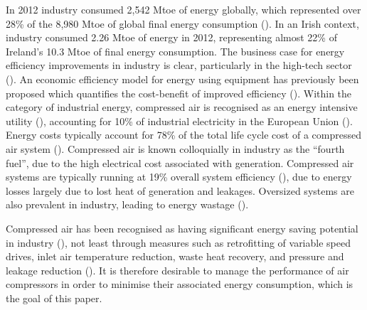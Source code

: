 In 2012 industry consumed 2,542 Mtoe of energy globally, which represented  over 28\% of the 8,980 Mtoe of global final energy consumption (\cite{IEA2012}). In an Irish context, industry consumed 2.26 Mtoe of energy in 2012, representing almost 22\% of Ireland’s 10.3 Mtoe of final energy consumption. The business case for energy efficiency improvements in industry is clear, particularly in the high-tech sector (\cite{Mills2007}). An economic efficiency model for energy using equipment has previously been proposed which quantifies the cost-benefit of improved efficiency (\cite{Blum2014}). Within the category of industrial energy, compressed air is recognised as an energy intensive utility (\cite{Wang2013a}), accounting for 10\% of industrial electricity in the European Union (\cite{Saidur2010}). Energy costs typically account for 78\% of the total life cycle cost of a compressed air system (\cite{radgen2006efficiency}). Compressed air is known colloquially in industry as the “fourth fuel”, due to the high electrical cost associated with generation. Compressed air systems are typically running at 19\% overall system efficiency (\cite{Saidur2010}), due to energy losses largely due to lost heat of generation and leakages. Oversized systems are also prevalent in industry, leading to energy wastage (\cite{Laurijssen2013}).

\bigskip

Compressed air has been recognised as having significant energy saving potential in industry (\cite{Wang2014}), not least through measures such as retrofitting of variable speed drives, inlet air temperature reduction, waste heat recovery, and pressure and leakage reduction (\cite{Wang2008}). It is therefore desirable to manage the performance of air compressors in order to minimise their associated energy consumption, which is the goal of this paper.

